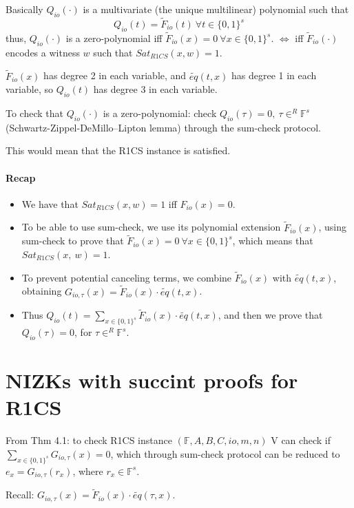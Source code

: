 \documentclass{article}
\theoremstyle{definition}
\begin{document}
Basically $Q_{io}(\cdot)$ is a multivariate (the unique multilinear) polynomial such that
$$Q_{io}(t) = \widetilde{F}_{io}(t) ~\forall t \in \{0,1\}^s$$
thus, $Q_{io}(\cdot)$ is a zero-polynomial iff $\widetilde{F}_{io}(x)=0 ~\forall x\in \{0,1\}^s$.
$\Longleftrightarrow$ iff $\widetilde{F}_{io}(\cdot)$ encodes a witness $w$ such that $Sat_{R1CS}(x, w)=1$.

$\widetilde{F}_{io}(x)$ has degree 2 in each variable, and $\widetilde{eq}(t, x)$ has degree 1 in each variable, so $Q_{io}(t)$ has degree 3 in each variable.

To check that $Q_{io}(\cdot)$ is a zero-polynomial: check $Q_{io}(\tau)=0,~ \tau \in^R \mathbb{F}^s$ (Schwartz-Zippel-DeMillo–Lipton lemma) through the sum-check protocol.

This would mean that the R1CS instance is satisfied.


\paragraph{Recap}
\begin{itemize}
	\item[] We have that $Sat_{R1CS}(x,w)=1$ iff $F_{io}(x)=0$.
	\item[] To be able to use sum-check, we use its polynomial extension $\widetilde{F}_{io}(x)$, using sum-check to prove that $\widetilde{F}_{io}(x) =0 ~\forall x \in \{0, 1\}^s$, which means that $Sat_{R1CS}(x,~w)=1$.
	\item[] To prevent potential canceling terms, we combine $\widetilde{F}_{io}(x)$ with $\widetilde{eq}(t, x)$, obtaining $G_{io, \tau}(x)= \widetilde{F}_{io}(x) \cdot \widetilde{eq}(t, x)$.
	\item[] Thus $Q_{io}(t)= \sum_{x \in \{0,1\}^s} \widetilde{F}_{io}(x) \cdot \widetilde{eq}(t, x)$, and then we prove that $Q_{io}(\tau)=0$, for $\tau \in^R \mathbb{F}^s$.
\end{itemize}

\section{NIZKs with succint proofs for R1CS}

From Thm 4.1: to check R1CS instance $(\mathbb{F}, A, B, C, io, m, n)$ V can check if
$\sum_{x \in \{0,1\}^s} G_{io, \tau} (x) = 0$, which through sum-check protocol can be reduced to $e_x = G_{io, \tau} (r_x)$, where $r_x \in \mathbb{F}^s$.

Recall: $G_{io, \tau}(x) = \widetilde{F}_{io}(x) \cdot \widetilde{eq}(\tau, x)$.
\end{document}
